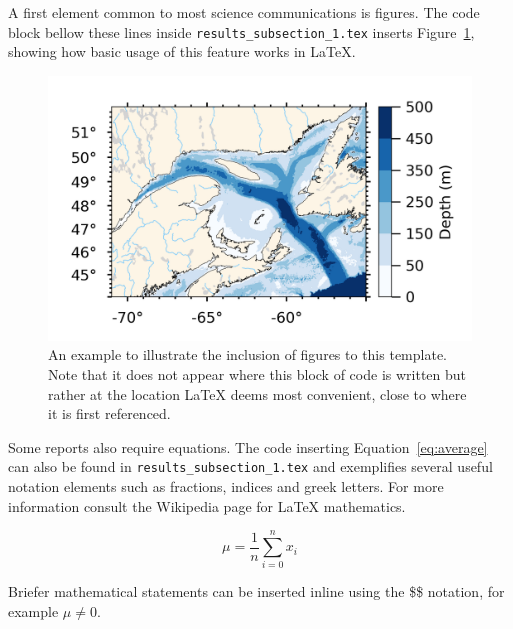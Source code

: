 A first element common to most science communications is figures. The code block bellow these lines inside \texttt{results\_subsection\_1.tex} inserts Figure~\ref{fig:ex}, showing how basic usage of this feature works in LaTeX. 

\begin{figure}[ht]
    \centering
    \includegraphics[width=0.75\linewidth]{figures/gsl_bathymetry_gebco.png}
    \caption{An example to illustrate the inclusion of figures to this template. Note that it does not appear where this block of code is written but rather at the location LaTeX deems most convenient, close to where it is first referenced.}
    \label{fig:ex}
\end{figure}

Some reports also require equations. The code inserting Equation~\ref{eq:average} can also be found in \texttt{results\_subsection\_1.tex} and exemplifies several useful notation elements such as fractions, indices and greek letters. For more information consult the Wikipedia page for LaTeX mathematics.

\begin{equation}
    \mu = \frac{1}{n}\sum_{i=0}^{n}x_i
    \label{eq:average}
\end{equation}

\noindent
Briefer mathematical statements can be inserted inline using the \$\$ notation, for example $\mu \neq 0$.